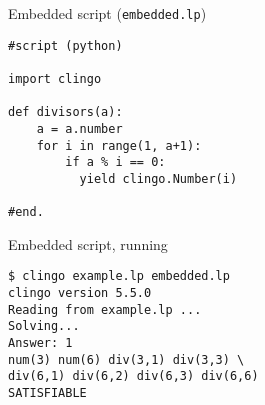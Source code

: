 \begin{frame}[fragile]{Embedded script (\texttt{embedded.lp})}
  \bigskip
\begin{lstlisting}
#script (python)

import clingo

def divisors(a):
    a = a.number
    for i in range(1, a+1):
        if a % i == 0:
          yield clingo.Number(i)

#end.
\end{lstlisting}
\end{frame}
\begin{frame}[fragile]{Embedded script, running}
  \bigskip
\begin{lstlisting}
$ clingo example.lp embedded.lp
clingo version 5.5.0
Reading from example.lp ...
Solving...
Answer: 1
num(3) num(6) div(3,1) div(3,3) \
div(6,1) div(6,2) div(6,3) div(6,6)
SATISFIABLE
\end{lstlisting}
\end{frame}
%
